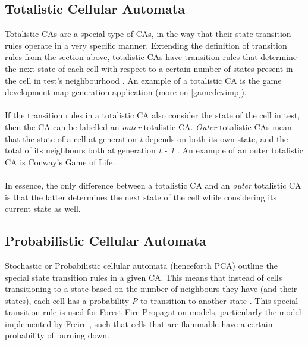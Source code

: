 \subsection{Totalistic Cellular Automata}

Totalistic CAs are a special type of CAs, in the way that their state transition rules operate in a very specific manner. Extending the definition of transition rules from the section above, totalistic CAs have transition rules that determine the next state of each cell with respect to a certain number of states present in the cell in test's neighbourhood \cite{wolfram_2002}. An example of a totalistic CA is the game development map generation application (more on \ref{gamedevimp}).
\\ \\
If the transition rules in a totalistic CA also consider the state of the cell in test, then the CA can be labelled an \textit{outer} totalistic CA. \textit{Outer} totalistic CAs mean that the state of a cell at generation \textit{t} depends on both its own state, and the total of its neighbours both at generation \textit{t - 1} \cite{ilachinski_2002}. An example of an outer totalistic CA is Conway's Game of Life.
\\ \\
In essence, the only difference between a totalistic CA and an 
\textit{outer} totalistic CA is that the latter determines the next state of the cell while considering its current state as well.

\subsection{Probabilistic Cellular Automata}
Stochastic or Probabilistic cellular automata (henceforth PCA) outline the special state transition rules in a given CA. This means that instead of cells transitioning to a state based on the number of neighbours they have (and their states), each cell has a probability \textit{P} to transition to another state \cite{louis_nardi_2018}. This special transition rule is used for Forest Fire Propagation models, particularly the model implemented by Freire \cite{freire}, such that cells that are flammable have a certain probability of burning down. 

\newpage
